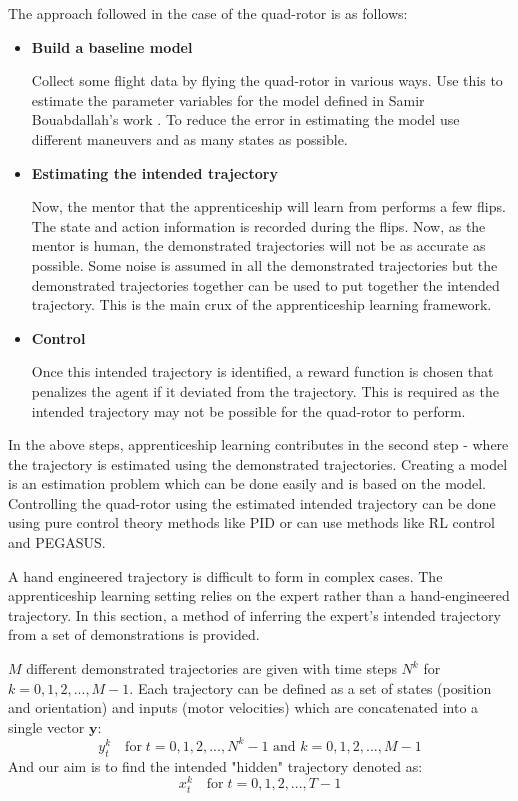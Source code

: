 \documentclass[hidelinks,BTech]{iitmdiss}
\begin{document}
The approach followed in the case of the quad-rotor is as follows:

\begin{itemize}
\item{{\bf Build a baseline model}

Collect some flight data by flying the quad-rotor in various ways. Use this to estimate the parameter variables for the model defined in Samir Bouabdallah's work \cite{QuadrotorDynamics}. To reduce the error in estimating the model use different maneuvers and as many states as possible.}

\item{{\bf Estimating the intended trajectory}

Now, the mentor that the apprenticeship will learn from performs a few flips. The state and action information is recorded during the flips. Now, as the mentor is human, the demonstrated trajectories will not be as accurate as possible. Some noise is assumed in all the demonstrated trajectories but the demonstrated trajectories together can be used to put together the intended trajectory. This is the main crux of the apprenticeship learning framework.}

\item{{\bf Control}

Once this intended trajectory is identified, a reward function is chosen that penalizes the agent if it deviated from the trajectory. This is required as the intended trajectory may not be possible for the quad-rotor to perform.}

\end{itemize}

In the above steps, apprenticeship learning contributes in the second step - where the trajectory is estimated using the demonstrated trajectories. Creating a model is an estimation problem \cite{EstTheo} which can be done easily and is based on the model. Controlling the quad-rotor using the estimated intended trajectory can be done using pure control theory methods like PID or can use methods like RL control and PEGASUS.

A hand engineered trajectory is difficult to form in complex cases. The apprenticeship learning setting relies on the expert rather than a hand-engineered trajectory. In this section, a method of inferring the expert's intended trajectory from a set of demonstrations is provided.

$M$ different demonstrated trajectories are given with time steps $N^k$ for $k = 0, 1, 2, ..., M-1$. Each trajectory can be defined as a set of states (position and orientation) and inputs (motor velocities) which are concatenated into a single vector $\mathbf{y}$:
\begin{equation}
  y_{t}^{k} \quad \text{for} \; t = 0, 1, 2, ..., N^{k}-1 \text{ and } k = 0, 1, 2, ..., M-1
\end{equation}
And our aim is to find the intended "hidden" trajectory denoted as:
\begin{equation}
  x_{t}^{k} \quad \text{for} \; t = 0, 1, 2, ..., T-1
\end{equation}
\end{document}
